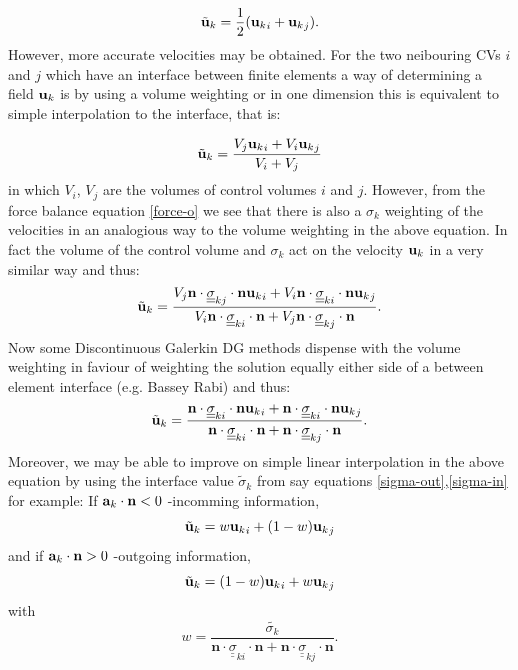\begin{equation}
{\tilde{\bf u}_k} = \frac{1}{2} ({{\bf u}_k}_i+{{\bf u}_k}_j).
\end{equation}
However, more accurate velocities may be obtained.
For the two neibouring CVs $i$ and $j$ which have an interface
between finite elements a way of determining a field ${\bf u}_k$ is by using a volume
weighting or in one dimension this is equivalent to simple interpolation to the interface, that is:

\begin{equation}
{\tilde{\bf u}_k} = \frac{ V_j {{\bf u}_k}_i + V_i {{\bf u}_k}_j  } {V_i +V_j}
\end{equation}
in which $V_i$, $V_j$ are the volumes of control volumes $i$ and $j$.
However, from the force balance equation
\ref{force-o}  we see that there is also a $\sigma_k$ weighting of the
velocities in an analogious way to the volume weighting in the above equation.
In fact the volume of the control volume and $\sigma_k$ act on the velocity ${\bf u}_k$ in a very similar
way and thus:
\begin{equation}
{\tilde{\bf u}_k} = \frac{ V_j \mathbf{n}\cdot \underline {\underline\sigma}_{kj} \cdot \mathbf{n} {{\bf u}_k}_i + V_i \mathbf{n}\cdot \underline {\underline\sigma}_{ki} \cdot \mathbf{n} {{\bf u}_k}_j }
{ V_i \mathbf{n}\cdot \underline {\underline\sigma}_{ki} \cdot \mathbf{n} + V_j  {\mathbf{n}\cdot \underline {\underline\sigma}_{kj} \cdot \mathbf{n} }}.
\end{equation}
Now some Discontinuous Galerkin DG methods dispense with the volume weighting
in faviour of weighting the solution equally either side of a between element interface (e.g. Bassey Rabi)
and thus:
\begin{equation}
{\tilde{\bf u}_k} = \frac{ \mathbf{n}\cdot \underline {\underline\sigma}_{ki} \cdot \mathbf{n}{{\bf u}_k}_i + \mathbf{n}\cdot \underline {\underline\sigma}_{ki} \cdot \mathbf{n} {{\bf u}_k}_j }
{ \mathbf{n}\cdot \underline {\underline\sigma}_{ki} \cdot \mathbf{n} + \mathbf{n}\cdot \underline {\underline\sigma}_{kj} \cdot \mathbf{n} }.
\end{equation}
Moreover, we may be able to improve on simple linear interpolation in the above equation
by using the interface value $\tilde\sigma_k$ from say equations \ref{sigma-out},\ref{sigma-in} for
example:
If ${\bf a}_k\cdot {\bf n}<0$ -incomming information,
\begin{equation}
{\tilde{\bf u}_k} = w {{\bf u}_k}_i + (1-w) {{\bf u}_k}_j
\end{equation}
and if ${\bf a}_k\cdot {\bf n}>0$ -outgoing information,
\begin{equation}
{\tilde{\bf u}_k} = (1-w) {{\bf u}_k}_i + w {{\bf u}_k}_j
\end{equation}
with
\begin{equation}
w=\frac{\tilde{\sigma_k}}{ \mathbf{n}\cdot \underline {\underline\sigma}_{ki} \cdot \mathbf{n} + \mathbf{n}\cdot \underline {\underline\sigma}_{kj} \cdot \mathbf{n} }.
\end{equation}


